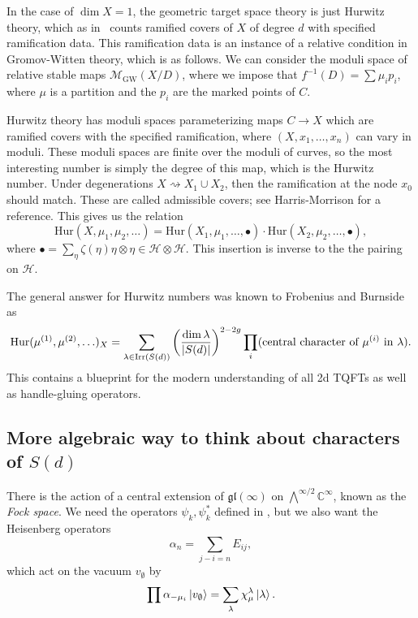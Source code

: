 \documentclass[leqno, openany]{memoir}
\theoremstyle{definition}
\theoremstyle{remark}
\theoremstyle{plain}
\theoremstyle{definition}
\theoremstyle{remark}
\newcommand{\C}{\mathbb{C}}
\newcommand{\mc}[1]{\mathcal{#1}}
\newcommand{\mf}[1]{\mathfrak{#1}}
\newcommand{\mr}[1]{\mathrm{#1}}
\begin{document}
In the case of $\dim X = 1$, the geometric target space theory is just Hurwitz theory, which as in~ counts ramified covers of $X$ of degree $d$ with specified ramification data. This ramification data is an instance of a relative condition in Gromov-Witten theory, which is as follows. We can consider the moduli space of relative stable maps $\mc{M}_{\mr{GW}}(X/D)$, where we impose that $f^{-1}(D) = \sum \mu_i p_i$, where $\mu$ is a partition and the $p_i$ are the marked points of $C$.

Hurwitz theory has moduli spaces parameterizing maps $C \to X$ which are ramified covers with the specified ramification, where $(X, x_1, \ldots, x_n)$ can vary in moduli. These moduli spaces are finite over the moduli of curves, so the most interesting number is simply the degree of this map, which is the Hurwitz number. Under degenerations $X \rightsquigarrow X_1 \cup X_2$, then the ramification at the node $x_0$ should match. These are called admissible covers; see Harris-Morrison for a reference. This gives us the relation
\[ \mr{Hur}(X, \mu_1, \mu_2, \ldots) = \mr{Hur}(X_1, \mu_1, \ldots, \bullet) \cdot \mr{Hur}(X_2, \mu_2, \ldots, \bullet), \]
where $\bullet = \sum_{\eta} \zeta(\eta) \eta \otimes \eta \in \mc{H} \otimes \mc{H}$. This insertion is inverse to the the pairing on $\mc{H}$.

The general answer for Hurwitz numbers was known to Frobenius and Burnside as
\[ \mr{Hur}(\mu^{(1)}, \mu^{(2)}, \ldots)_X = \sum_{\lambda \in \mr{Irr}(S(d))} \qty(\frac{\dim \lambda}{\abs{S(d)}})^{2-2g} \prod_i (\text{central character of }\mu^{(i)}\text{ in }\lambda). \]
This contains a blueprint for the modern understanding of all 2d TQFTs as well as handle-gluing operators.

\subsection{More algebraic way to think about characters of $S(d)$}

There is the action of a central extension of $\mf{gl}(\infty)$ on $\bigwedge^{\infty/2} \C^{\infty}$, known as the \textit{Fock space}. We need the operators $\psi_k, \psi_k^*$ defined in , but we also want the Heisenberg operators
\[ \alpha_n = \sum_{j-i=n} E_{ij}, \]
which act on the vacuum $v_{\emptyset}$ by
\[ \prod \alpha_{-\mu_i} \ket{v_{\emptyset}} = \sum_{\lambda} \chi_{\mu}^{\lambda} \ket{\lambda}. \]
\end{document}
